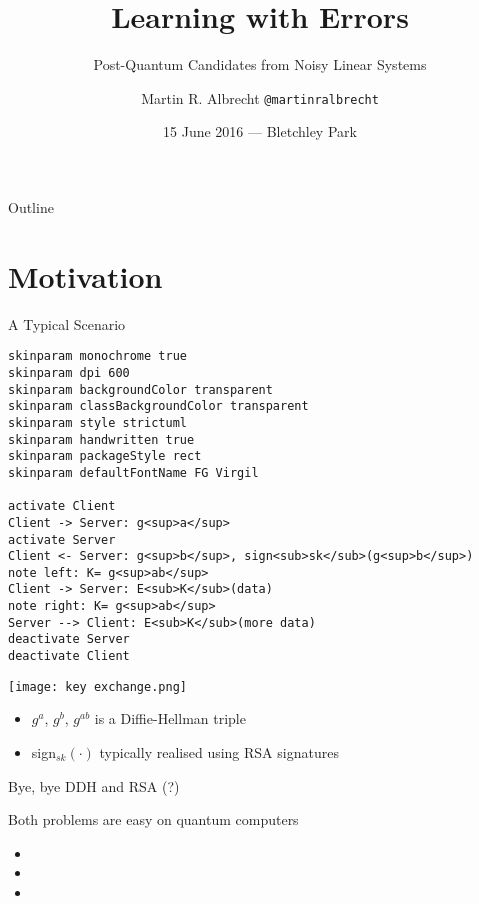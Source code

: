 \documentclass[presentation,smaller]{beamer}
\author{Martin R. Albrecht \texttt{@martinralbrecht}}
\date{15 June 2016 — Bletchley Park}
\title{Learning with Errors}
\subtitle{Post-Quantum Candidates from Noisy Linear Systems}
\begin{document}
\maketitle
\begin{frame}{Outline}
\tableofcontents
\end{frame}


\section{Motivation}
\label{sec:org9621948}

\begin{frame}[fragile,label={sec:orgdb9f820}]{A Typical Scenario}
 \lstset{language=plantuml,label= ,caption= ,captionpos=b,numbers=none}
\begin{lstlisting}
skinparam monochrome true
skinparam dpi 600
skinparam backgroundColor transparent
skinparam classBackgroundColor transparent
skinparam style strictuml
skinparam handwritten true
skinparam packageStyle rect
skinparam defaultFontName FG Virgil

activate Client
Client -> Server: g<sup>a</sup>
activate Server
Client <- Server: g<sup>b</sup>, sign<sub>sk</sub>(g<sup>b</sup>)
note left: K= g<sup>ab</sup>
Client -> Server: E<sub>K</sub>(data)
note right: K= g<sup>ab</sup>
Server --> Client: E<sub>K</sub>(more data)
deactivate Server
deactivate Client
\end{lstlisting}

\begin{center}
\begin{center}
\texttt{[image: key exchange.png]}
\end{center}
\end{center}

\begin{itemize}
\item \(g^a\), \(g^b\), \(g^{ab}\) is a \alert{Diffie-Hellman} triple
\item sign\(_{sk}(⋅)\) typically realised using \alert{RSA} signatures
\end{itemize}
\end{frame}

\begin{frame}[label={sec:org1437367}]{Bye, bye DDH and RSA (?)}
\begin{center}
Both problems are easy on quantum computers
\end{center}

\pause

\begin{itemize}[<+->]
\item {}
\item {}
\item {}
\end{itemize}
\end{frame}
\end{document}
